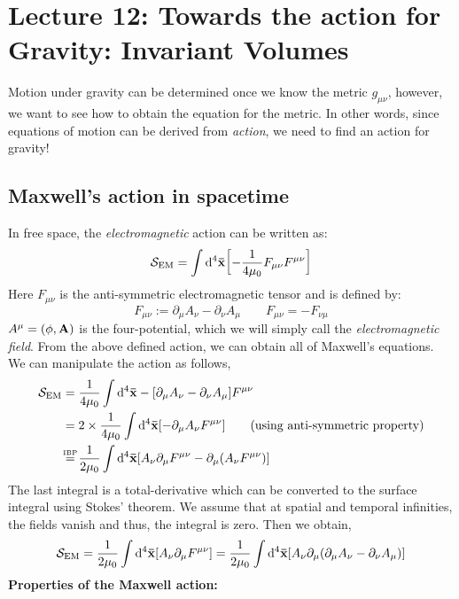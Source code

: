 \section*{Lecture 12: Towards the action for Gravity: Invariant Volumes}
Motion under gravity can be determined once we know the metric $g_{\mu\nu}$, however, we want to see how to obtain the equation for the metric. In other words, since equations of motion can be derived from \textit{action}, we need to find an action for gravity!
\subsection{Maxwell's action in spacetime}
In free space, the \textit{electromagnetic} action can be written as:
$$\mathcal S_{\mathrm{EM}} = \int \dd^4\vb{\bar{x}} \qty[-\frac{1}{4\mu_0}F_{\mu\nu}F^{\mu\nu}]$$
Here $F_{\mu\nu}$ is the anti-symmetric electromagnetic tensor and is defined by:
\begin{equation}\label{eqn:fmunu}
    F_{\mu\nu}:= \partial_\mu A_{\nu} - \partial_\nu A_{\mu}\qquad F_{\mu\nu} = -F_{\nu\mu}
\end{equation}
$A^\mu = \qty(\phi, \vb{{A}})$ is the four-potential, which we will simply call the \textit{electromagnetic field}. From the above defined action, we can obtain all of Maxwell's equations. We can manipulate the action as follows,
\begin{align*}
    \Ss_{\mathrm{EM}} &= \frac{1}{4\mu_0}\int \dd^4\fvec{x} - \qty[\partial_\mu A_\nu -\partial_\nu A_\mu  ]F^{\mu\nu}\\
    &=2\times \frac{1}{4\mu_0}\int \dd^4\fvec{x} \qty[-\partial_\mu A_{\nu}F^{\mu\nu}]\qquad \text{(using anti-symmetric property)} \\
    &\myeq{IBP}\frac{1}{2\mu_0}\int \dvol \qty[A_\nu \partial_\mu F^{\mu\nu} - \partial_\mu\qty(A_\nu F^{\mu\nu})]
\end{align*} 
The last integral is a total-derivative which can be converted to the surface integral using Stokes' theorem. We assume that at spatial and temporal infinities, the fields vanish and thus, the integral is zero. Then we obtain,
\begin{align*}
    \mathcal S_{\mathrm{EM}} = \frac{1}{2\mu_0}\int \dd^4\vb{\bar{x}} \qty[A_\nu \partial_\mu F^{\mu\nu}] =\frac{1}{2\mu_0}\int \dd^4\vb{\bar{x}} \qty[A_\nu \partial_\mu \qty(\partial_\mu A_{\nu} - \partial_\nu A_{\mu}) ] 
\end{align*}
\textbf{Properties of the Maxwell action:}
